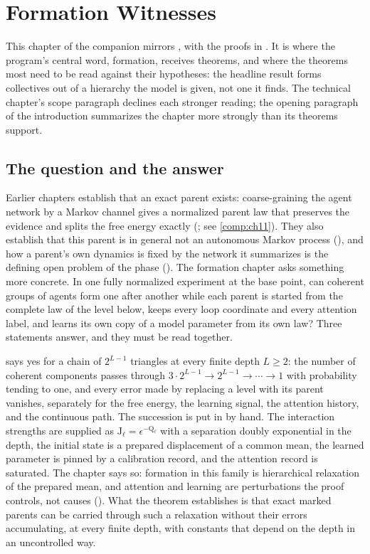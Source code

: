 \chapter{Formation Witnesses}
\label{comp:ch13}

This chapter of the companion mirrors , with the proofs in
. It is where the program's central word, formation, receives
theorems, and where the theorems most need to be read against their hypotheses: the headline result
forms collectives out of a hierarchy the model is given, not one it finds. The technical chapter's scope
paragraph declines each stronger reading; the opening paragraph of the introduction summarizes the
chapter more strongly than its theorems support.

\section{The question and the answer}
\label{comp:ch13-question}

Earlier chapters establish that an exact parent exists: coarse-graining the agent network by a Markov
channel gives a normalized parent law that preserves the evidence and splits the free energy exactly
(; see \cref{comp:ch11}). They also establish that this parent is in
general not an autonomous Markov process (), and how a parent's own
dynamics is fixed by the network it summarizes is the defining open problem of the phase
(). The formation chapter asks something more concrete. In one
fully normalized experiment at the base point, can coherent groups of agents form one after another
while each parent is started from the complete law of the level below, keeps every loop coordinate and
every attention label, and learns its own copy of a model parameter from its own law? Three statements
answer, and they must be read together.

 says yes for a chain of \(2^{L-1}\) triangles at every finite
depth \(L\ge2\): the number of coherent components passes through
\(3\cdot2^{L-1}\to2^{L-1}\to\cdots\to1\) with probability tending to one, and every error made by
replacing a level with its parent vanishes, separately for the free energy, the learning signal, the
attention history, and the continuous path. The succession is put in by hand. The interaction
strengths are supplied as \(\mathrm J_\ell=\epsilon^{-\mathrm Q_\ell}\) with a separation doubly
exponential in the depth, the initial state is a prepared displacement of a common mean, the learned
parameter is pinned by a calibration record, and the attention record is saturated. The chapter says so:
formation in this family is hierarchical relaxation of the prepared mean, and attention and learning
are perturbations the proof controls, not causes (). What the theorem
establishes is that exact marked parents can be carried through such a relaxation without their errors
accumulating, at every finite depth, with constants that depend on the depth in an uncontrolled way.

